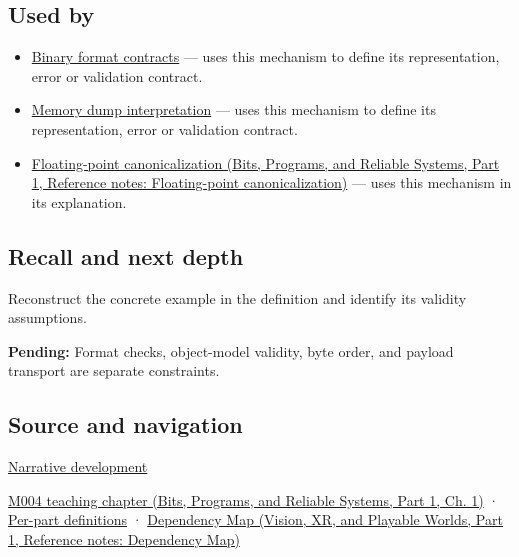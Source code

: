 \subsection{Used by}\label{appendix-34ee45f161c1-used-by}

\hypertarget{appendix-34ee45f161c1-used-by}{}

\begin{itemize}
\item
  \hyperref[appendix-590bbb2424c1]{Binary format contracts} --- uses this mechanism to define its representation, error or validation contract.
\item
  \hyperref[appendix-230b59c0676b]{Memory dump interpretation} --- uses this mechanism to define its representation, error or validation contract.
\item
  \href{../01-Bits-Programs-and-Reliable-Systems-P01/main.pdf\#nameddest=appendix-e90053a4b201}{Floating-point canonicalization (Bits, Programs, and Reliable Systems, Part 1, Reference notes: Floating-point canonicalization)} --- uses this mechanism in its explanation.
\end{itemize}

\subsection{Recall and next depth}\label{appendix-34ee45f161c1-recall-and-next-depth}

\hypertarget{appendix-34ee45f161c1-recall-and-next-depth}{}

Reconstruct the concrete example in the definition and identify its validity assumptions.

\textbf{Pending:} Format checks, object-model validity, byte order, and payload transport are separate constraints.

\subsection{Source and navigation}\label{appendix-34ee45f161c1-source-and-navigation}

\hypertarget{appendix-34ee45f161c1-source-and-navigation}{}

\hyperref[01-foundations-i-ch002-bytes-become-a-durable-agreement]{Narrative development}

\href{../01-Bits-Programs-and-Reliable-Systems-P01/main.pdf\#nameddest=01-foundations-i-ch001-a-stretching-ruler-for-real-valued-quantities}{M004 teaching chapter (Bits, Programs, and Reliable Systems, Part 1, Ch. 1)} · \hyperref[appendix-fd090d982a15-m004---parts-61-76]{Per-part definitions} · \href{../07-Vision-XR-and-Playable-Worlds-P01/main.pdf\#nameddest=appendix-4ad47bdd269a}{Dependency Map (Vision, XR, and Playable Worlds, Part 1, Reference notes: Dependency Map)}
